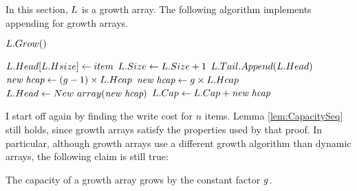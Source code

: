 \HdrGrowthArrayImpl

In this section, $\VarList$ is a growth array. The following algorithm implements appending for growth arrays.

\begin{algorithm}
	\begin{algorithmic}[1]
		\State $L.Grow()$
		\EndIf
		
		\State $L.Head[L.Hsize] \gets item$
		\State $L.Size \gets L.Size + 1$
		\EndProcedure
		\Statex
		\Procedure{$\FuncGrow$}{$\VarList$}
		\State $L.Tail.Append(L.Head)$
			\State $\textit{new hcap} \gets (g - 1) \times L.Hcap$
		\Else
			\State $\textit{new hcap} \gets g \times L.Hcap$
		\EndIf
		\State $L.Head \gets New\ array(\textit{new hcap})$
		\State $L.Cap \gets L.Cap + \textit{new hcap}$
		\EndProcedure
	\end{algorithmic}
\end{algorithm}

\HdrTimeComplex

I start off again by finding the write cost for $n$ items. Lemma \ref{lem:CapacitySeq} still holds, since growth arrays satisfy the properties used by that proof. In particular, although growth arrays use a different growth algorithm than dynamic arrays, the following claim is still true:

\begin{lemma}
\label{lem:GrowthArraysGrowthFactor}
	The capacity of a growth array grows by the constant factor $g$.
\end{lemma}

